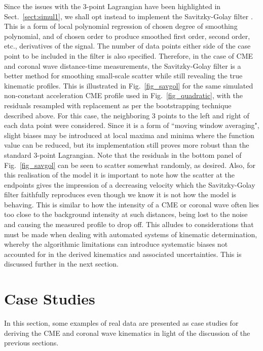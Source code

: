\documentclass[referee]{aa}
\begin{document}
Since the issues with the 3-point Lagrangian have been highlighted in Sect.~\ref{sect:simul1}, we shall opt instead to implement the Savitzky-Golay filter \citep{Savitzky-Golay1964}. This is a form of local polynomial regression of chosen degree of smoothing polynomial, and of chosen order to produce smoothed first order, second order, etc., derivatives of the signal. The number of data points either side of the case point to be included in the filter is also specified. Therefore, in the case of CME and coronal wave distance-time measurements, the Savitzky-Golay filter is a better method for smoothing small-scale scatter while still revealing the true kinematic profiles. This is illustrated in Fig.~\ref{fig_savgol} for the same simulated non-constant acceleration CME profile used in Fig.~\ref{fig_quadratic}, with the residuals resampled with replacement as per the bootstrapping technique described above. For this case, the neighboring 3 points to the left and right of each data point were considered. Since it is a form of ``moving window averaging", slight biases may be introduced at local maxima and minima where the function value can be reduced, but its implementation still proves more robust than the standard 3-point Lagrangian. Note that the residuals in the bottom panel of Fig.~\ref{fig_savgol} can be seen to scatter somewhat randomly, as desired. Also, for this realisation of the model it is important to note how the scatter at the endpoints gives the impression of a decreasing velocity which the Savitzky-Golay filter faithfully reproduces even though we know it is not how the model is behaving. This is similar to how the intensity of a CME or coronal wave often lies too close to the background intensity at such distances, being lost to the noise and causing the measured profile to drop off. This alludes to considerations that must be made when dealing with automated systems of kinematic determination, whereby the algorithmic limitations can introduce systematic biases not accounted for in the derived kinematics and associated uncertainties. This is discussed further in the next section.



\section{Case Studies}
\label{sect:case_studies}

In this section, some examples of real data are presented as case studies for deriving the CME and coronal wave kinematics in light of the discussion of the previous sections. 
\end{document}
